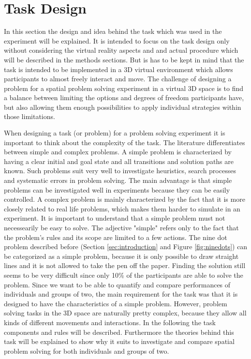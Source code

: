 \section{Task Design}

In this section the design and idea behind the task which was used in the experiment will be explained. It is intended to focus on the task design only without considering the virtual reality aspects and and actual procedure which will be described in the methods sections. But is has to be kept in mind that the task is intended to be implemented in a 3D virtual environment which allows participants to almost freely interact and move. The challenge of designing a problem for a spatial problem solving experiment in a virtual 3D space is to find a balance between limiting the options and degrees of freedom participants have, but also allowing them enough possibilities to apply individual strategies within those limitations.

When designing a task (or problem) for a problem solving experiment it is important to think about the complexity of the task. The literature differentiates between simple and complex problems. \cite{muesseler2015allgemeine}  A simple problem is characterized by having a clear initial  and goal state and all transitions and solution paths are known. Such problems suit very well to investigate heuristics, search processes and systematic errors in problem solving. The main advantage is that simple problems can be investigated well in experiments because they can be easily controlled. A complex problem is mainly characterized by the fact that it is more closely related to real life problems, which makes them harder to simulate in an experiment. It is important to understand that a simple problem must not necessearily be easy to solve. The adjective "simple" refers only to the fact that the problem's rules and its scope are limited to a few actions. The nine dot problem described before (Section \ref{sec:introduction} and Figure \ref{fig:ninedots}) can be categorized as a simple problem, because it is only possible to draw straight lines and it is not allowed to take the pen off the paper. Finding the solution still seems to be very difficult since only 10\% of the participants are able to solve the problem. \cite{muesseler2015allgemeine} 
Since we want to be able to quantify and compare performances of individuals and groups of two, the main requirement for the task  was that it is designed to have the characteristics of a simple problem. However, problem solving tasks in the 3D space are naturally pretty complex, because they allow all kinds of different movements and interactions. In the following the task components and rules will be described. Furthermore the theories behind this task will be explained to show why it suits to investigate and compare spatial problem solving for both individuals and groups of two.

